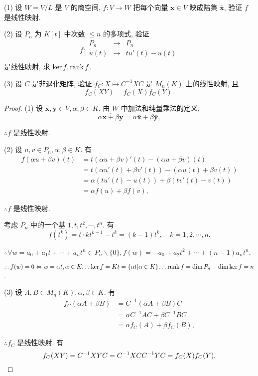 \documentclass{ctexart}
\begin{document}
\begin{exercise}\label{ex1.2}
    (1) 设 $W=V/L$ 是 $V$ 的商空间, $f:V\to W$ 把每个向量 $\boldsymbol{x}\in V$ 映成陪集 $\bar{\boldsymbol{x}}$, 验证 $f$ 是线性映射.

    (2) 设 $P_n$ 为 $K[t]$ 中次数 $\leq n$ 的多项式, 验证
    \[f:\begin{array}{rcl}
        P_n & \to & P_n \\
        u(t) & \to & tu'(t)-u(t) \\
    \end{array}\]
    是线性映射, 求 $\ker f,\operatorname{rank} f$.

    (3) 设 $C$ 是非退化矩阵, 验证 $f_C:X\mapsto C^{-1}XC$ 是 $M_n(K)$ 上的线性映射, 且
    \[f_C(XY)=f_C(X)f_C(Y).\]
\end{exercise}
\begin{proof}
    (1) 设 $\boldsymbol{x},\boldsymbol{y}\in V,\alpha,\beta\in K$. 由 $W$ 中加法和纯量乘法的定义,
    \[\overline{\alpha\boldsymbol{x}+\beta\boldsymbol{y}}=\alpha\bar{\boldsymbol{x}}+\beta\bar{\boldsymbol{y}},\]

    $\therefore f$ 是线性映射.

    (2) 设 $u,v\in P_n,\alpha,\beta\in K$. 有
    \begin{align*}
        f(\alpha u+\beta v)(t) & =t(\alpha u+\beta v)'(t)-(\alpha u+\beta v)(t) \\
        & =t(\alpha u'(t)+\beta v'(t))-(\alpha u(t)+\beta v(t)) \\
        & =\alpha(tu'(t)-u(t))+\beta(tv'(t)-v(t)) \\
        & =\alpha f(u)+\beta f(v),
    \end{align*}

    $\therefore f$ 是线性映射.

    考虑 $P_n$ 中的一个基 $1,t,t^2,\cdots,t^n$. 有
    \[f(t^k)=t\cdot kt^{k-1}-t^k=(k-1)t^k,\quad k=1,2,\cdots,n.\]

    $\therefore\forall w=a_0+a_1t+\cdots+a_nt^n\in P_n\backslash\{0\},f(w)=-a_0+a_2t^2+\cdots+(n-1)a_nt^n$.

    $\therefore f(w)=0\Leftrightarrow w=\alpha t,\alpha\in K.\therefore\ker f=Kt=\{\alpha t|\alpha\in K\}.\therefore\operatorname{rank} f=\dim P_n-\dim\ker f=n$.

    (3) 设 $A,B\in M_n(K),\alpha,\beta\in K$. 有
    \begin{align*}
        f_C(\alpha A+\beta B) & =C^{-1}(\alpha A+\beta B)C \\
        & =\alpha C^{-1}AC+\beta C^{-1}BC \\
        & =\alpha f_C(A)+\beta f_C(B),
    \end{align*}

    $\therefore f_C$ 是线性映射. 有
    \[f_C(XY)=C^{-1}XYC=C^{-1}XCC^{-1}YC=f_C(X)f_C(Y).\qedhere\]
\end{proof}
\end{document}
